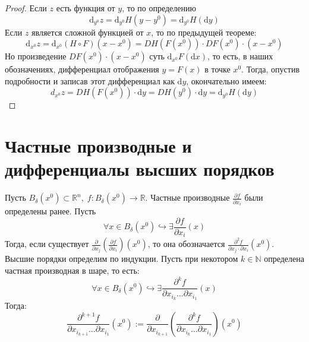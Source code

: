 \documentclass[11pt]{article}
\begin{document}
\begin{proof}
    Если $z$ есть функция от $y$, то по определению 
    \[\mathrm d_{y^0}z = \mathrm d_{y^0}H \left(y - y^0\right) = \mathrm d_{y^0}H (\mathrm dy)\] 
    Если $z$ является сложной функцией от $x$, то по предыдущей теореме:
    \[\mathrm d_{x^0}z = \mathrm d_{x^0}\left(H \circ F\right)\left(x - x^0\right) = DH\left(F\left(x^0\right)\right) \cdot DF\left(x^0\right) \cdot \left(x - x^0\right)\]
    Но произведение $DF\left(x^0\right) \cdot \left(x - x^0\right)$ суть $\mathrm{d}_{x^0}F(\mathrm{d}x)$, то есть, в наших обозначениях, дифференциал отображения $y = F(x)$ в точке $x^0$. Тогда, опустив подробности и записав этот дифференциал как $\mathrm{d} y$, окончательно имеем:
    \[d_{x^0}z = DH\left(F \left( x^0 \right)\right) \cdot \mathrm{d} y = DH\left(y^0\right) \cdot \mathrm{d} y = \mathrm{d}_{y^0}H \left(\mathrm{d}y\right)\]
\end{proof}

\section{Частные производные и дифференциалы высших порядков}

\begin{definition}
    Пусть $B_\delta\left(x^0\right) \subset \mathbb{R}^n, \; f \colon B_\delta\left(x^0\right) \to \mathbb{R}$.
    Частные производные
    $\displaystyle \frac{\partial f}{\partial x_i}$ были определены ранее. Пусть 
    \[\forall x \in B_\delta\left(x^0\right)  \hookrightarrow  \exists \frac{\partial f}{\partial x_i}(x)\]
    Тогда, если существует $\displaystyle \frac{\partial}{\partial x_j}\left(\frac{\partial f}
    {\partial x_i}\right)\left(x^0\right)$, то она обозначается $\displaystyle \frac{\partial^2 f}{\partial x_j \cdot \partial x_i} \left(x^0\right)$.
    Высшие порядки определим по индукции. Пусть при некотором $k \in \mathbb{N}$ определена частная 
    производная в шаре, то есть:
    \[\forall x \in B_{\delta}\left(x^0\right) \hookrightarrow \exists \frac{\partial^{k} f}{\partial x_{i_k} \ldots \partial x_{i_1}} (x)\]
    Тогда: 
    \[\frac{\partial^{k+1}f}{\partial x_{i_{k+1}}\dots 
    \partial x_{i_1}}\left(x^0\right) := \frac{\partial}{\partial x_{i_{k+1}}}\left(\frac{\partial^k f}{\partial x_{i_k} \dots 
    \partial x_{i_1}}\right)\left(x^0\right)\]
\end{definition}
\end{document}
